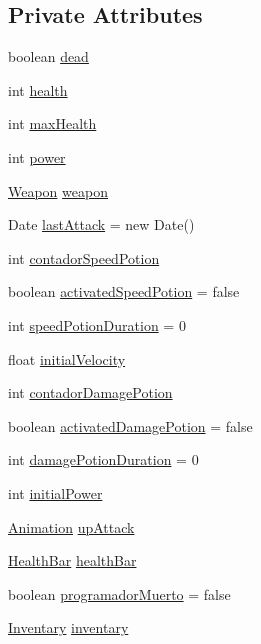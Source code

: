 \subsection*{Private Attributes}
\begin{DoxyCompactItemize}
\item 
boolean \mbox{\hyperlink{classentities_1_1_subject_aab6a2f2446349b10689270b86e7931a4}{dead}}
\item 
int \mbox{\hyperlink{classentities_1_1_subject_a8285660fdae3f0b220bbc686cf5c012c}{health}}
\item 
int \mbox{\hyperlink{classentities_1_1_subject_a72343827eacb9cf3a8807c0b0d1a4ace}{max\+Health}}
\item 
int \mbox{\hyperlink{classentities_1_1_subject_a7bd41d6fe9656de66d4a08c4a9565ec4}{power}}
\item 
\mbox{\hyperlink{classitems_1_1weapons_1_1_weapon}{Weapon}} \mbox{\hyperlink{classentities_1_1_subject_abb65e5fdf2a2b62efa2c9b1368c83f15}{weapon}}
\item 
Date \mbox{\hyperlink{classentities_1_1_subject_a2ca3b455a7b8de072990c4349a5dc5ca}{last\+Attack}} = new Date()
\item 
int \mbox{\hyperlink{classentities_1_1_subject_a1237103969aa7b4476849d5d7364a8d2}{contador\+Speed\+Potion}}
\item 
boolean \mbox{\hyperlink{classentities_1_1_subject_a93bf55544d557dfedf72520adb83f164}{activated\+Speed\+Potion}} = false
\item 
int \mbox{\hyperlink{classentities_1_1_subject_adcbbeb784303a8b3ec6df589655a0eb9}{speed\+Potion\+Duration}} = 0
\item 
float \mbox{\hyperlink{classentities_1_1_subject_a6a3d42736a480a8e510f7c316c7d7ad7}{initial\+Velocity}}
\item 
int \mbox{\hyperlink{classentities_1_1_subject_a549beb50154a4d53c53124ea79a4d740}{contador\+Damage\+Potion}}
\item 
boolean \mbox{\hyperlink{classentities_1_1_subject_a3609265fa27777d39b14f1a7f9f7cbb3}{activated\+Damage\+Potion}} = false
\item 
int \mbox{\hyperlink{classentities_1_1_subject_a5f16593520da1120bdbf179d22af603b}{damage\+Potion\+Duration}} = 0
\item 
int \mbox{\hyperlink{classentities_1_1_subject_a3c94d6a59743309345b5da2ee7eeb0ec}{initial\+Power}}
\item 
\mbox{\hyperlink{classorg_1_1newdawn_1_1slick_1_1_animation}{Animation}} \mbox{\hyperlink{classentities_1_1_subject_ab5b8390d2291803a2174b7ae146f86ac}{up\+Attack}}
\item 
\mbox{\hyperlink{classgui_1_1_health_bar}{Health\+Bar}} \mbox{\hyperlink{classentities_1_1_subject_a3b3d023ad2be3c1de4b8d8de98556b3c}{health\+Bar}}
\item 
boolean \mbox{\hyperlink{classentities_1_1_subject_a79362565afa5f3420bd609feb5074c78}{programador\+Muerto}} = false
\item 
\mbox{\hyperlink{classitems_1_1_inventary}{Inventary}} \mbox{\hyperlink{classentities_1_1_subject_a385ab8867c81188a3a092c3d8bd682fd}{inventary}}
\end{DoxyCompactItemize}

